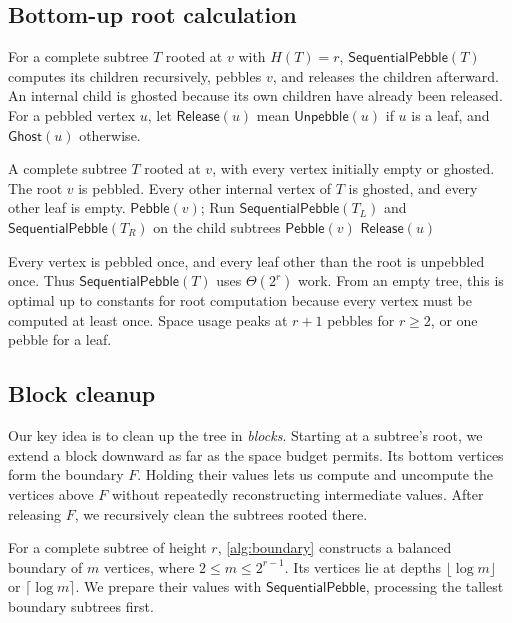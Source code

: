 \documentclass[11pt]{article}
\theoremstyle{definition}
\theoremstyle{remark}
\newcommand{\Peb}{\mathsf{Pebble}}
\newcommand{\Unp}{\mathsf{Unpebble}}
\newcommand{\Ghost}{\mathsf{Ghost}}
\newcommand{\Fast}{\mathsf{SequentialPebble}}
\newcommand{\Release}{\mathsf{Release}}
\begin{document}
\subsection{Bottom-up root calculation}
\label{sec:fast-root}

For a complete subtree $T$ rooted at $v$ with $H(T)=r$, $\Fast(T)$ computes its children recursively, pebbles $v$, and releases the children afterward. An internal child is ghosted because its own children have already been released. For a pebbled vertex $u$, let $\Release(u)$ mean $\Unp(u)$ if $u$ is a leaf, and $\Ghost(u)$ otherwise.

\begin{algorithm}[H]
\caption{Bottom-up root computation $\Fast(T)$}
\label{alg:fast-root}
\begin{algorithmic}[1]
\Require A complete subtree $T$ rooted at $v$, with every vertex initially empty or ghosted.
\Ensure The root $v$ is pebbled. Every other internal vertex of $T$ is ghosted, and every other leaf is empty.
 \State $\Peb(v)$; \Return
\EndIf
\State Run $\Fast(T_L)$ and $\Fast(T_R)$ on the child subtrees
\State $\Peb(v)$
\State $\Release(u)$
\EndFor
\end{algorithmic}
\end{algorithm}

Every vertex is pebbled once, and every leaf other than the root is unpebbled once. Thus $\Fast(T)$ uses $\Theta(2^r)$ work. From an empty tree, this is optimal up to constants for root computation because every vertex must be computed at least once. Space usage peaks at $r+1$ pebbles for $r\ge2$, or one pebble for a leaf.

\subsection{Block cleanup}
\label{sec:block-cleanup}

Our key idea is to clean up the tree in \emph{blocks}. Starting at a subtree's root, we extend a block downward as far as the space budget permits. Its bottom vertices form the boundary $F$. Holding their values lets us compute and uncompute the vertices above $F$ without repeatedly reconstructing intermediate values. After releasing $F$, we recursively clean the subtrees rooted there.

For a complete subtree of height $r$, \cref{alg:boundary} constructs a balanced boundary of $m$ vertices, where $2\le m\le2^{r-1}$. Its vertices lie at depths $\lfloor\log m\rfloor$ or $\lceil\log m\rceil$. We prepare their values with $\Fast$, processing the tallest boundary subtrees first.
\end{document}

